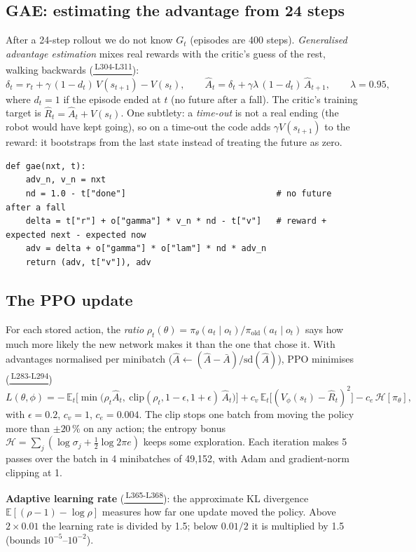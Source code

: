 \documentclass[10pt,letterpaper]{article}
\newcommand{\repo}{https://github.com/soujanya957/capstan-drive-leg/blob/231ca53/CapstanPedal/fullbuild_v4}
\newcommand{\gh}[2]{\href{\repo/#1\##2}{\texttt{\detokenize{#1}}\,\textsuperscript{\tiny #2}}}
\begin{document}
\subsection{GAE: estimating the advantage from 24 steps}
After a 24-step rollout we do not know $G_t$ (episodes are 400 steps). \emph{Generalised advantage estimation} mixes
real rewards with the critic's guess of the rest, walking backwards (\gh{rl2/train.py}{L304-L311}):
\[
\delta_t = r_t + \gamma\,(1-d_t)\,V(s_{t+1}) - V(s_t),\qquad
\hat A_t = \delta_t + \gamma\lambda\,(1-d_t)\,\hat A_{t+1},\qquad \lambda=0.95,
\]
where $d_t=1$ if the episode ended at $t$ (no future after a fall). The critic's training target is $\hat R_t=\hat A_t+V(s_t)$.
One subtlety: a \emph{time-out} is not a real ending (the robot would have kept going), so on a time-out the code adds
$\gamma V(s_{t+1})$ to the reward: it bootstraps from the last state instead of treating the future as zero.
\begin{lstlisting}
def gae(nxt, t):
    adv_n, v_n = nxt
    nd = 1.0 - t["done"]                              # no future after a fall
    delta = t["r"] + o["gamma"] * v_n * nd - t["v"]   # reward + expected next - expected now
    adv = delta + o["gamma"] * o["lam"] * nd * adv_n
    return (adv, t["v"]), adv
\end{lstlisting}

\subsection{The PPO update}
For each stored action, the \emph{ratio} $\rho_t(\theta)=\pi_\theta(a_t\mid o_t)/\pi_{\text{old}}(a_t\mid o_t)$ says how much more
likely the new network makes it than the one that chose it. With advantages normalised per minibatch
($\hat A\leftarrow(\hat A-\bar A)/\mathrm{sd}(\hat A)$), PPO minimises (\gh{rl2/train.py}{L283-L294})
\[
L(\theta,\phi)=-\,\mathbb{E}_t\Big[\min\big(\rho_t\hat A_t,\ \mathrm{clip}(\rho_t,1-\epsilon,1+\epsilon)\,\hat A_t\big)\Big]
+ c_v\,\mathbb{E}_t\big[(V_\phi(s_t)-\hat R_t)^2\big] - c_e\,\mathcal{H}[\pi_\theta],
\]
with $\epsilon=0.2$, $c_v=1$, $c_e=0.004$. The clip stops one batch from moving the policy more than $\pm20\,\%$ on any action;
the entropy bonus $\mathcal{H}=\sum_j(\log\sigma_j+\tfrac12\log2\pi e)$ keeps some exploration. Each iteration makes 5 passes
over the batch in 4 minibatches of 49{,}152, with Adam and gradient-norm clipping at 1.

\textbf{Adaptive learning rate} (\gh{rl2/train.py}{L365-L368}): the approximate KL divergence
$\mathbb{E}[(\rho-1)-\log\rho]$ measures how far one update moved the policy. Above $2\times0.01$ the learning rate is divided
by 1.5; below $0.01/2$ it is multiplied by 1.5 (bounds $10^{-5}$–$10^{-2}$).
\end{document}
